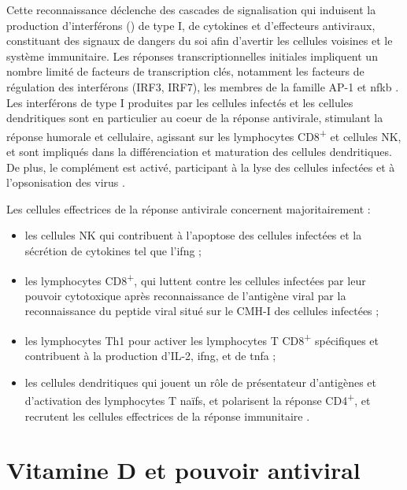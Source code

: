 \documentclass[
  a4paper,
  DIV=11,
  numbers=noendperiod,
  listof=totoc]{scrreprt}
\providecommand{\tightlist}{%
  \setlength{\itemsep}{0pt}\setlength{\parskip}{0pt}}\usepackage{longtable,booktabs,array}
\begin{document}
Cette reconnaissance déclenche des cascades de signalisation qui
induisent la production d'interférons () de type I, de
cytokines et d'effecteurs antiviraux, constituant des signaux de dangers
du soi afin d'avertir les cellules voisines et le système immunitaire.
Les réponses transcriptionnelles initiales impliquent un nombre limité
de facteurs de transcription clés, notamment les facteurs de régulation
des interférons (IRF3, IRF7), les membres de la famille AP-1 et
\ac{nfkb} \autocite{Bishop.2021,Ismailova.2022}. Les interférons de type
I produites par les cellules infectés et les cellules dendritiques sont
en particulier au coeur de la réponse antivirale, stimulant la réponse
humorale et cellulaire, agissant sur les lymphocytes
CD8\textsuperscript{+} et cellules \ac{NK}, et sont impliqués dans la
différenciation et maturation des cellules dendritiques. De plus, le
complément est activé, participant à la lyse des cellules infectées et à
l'opsonisation des virus \autocite{msd.complement.2024.official}.

Les cellules effectrices de la réponse antivirale concernent
majoritairement :

\begin{itemize}
\tightlist
\item
  les cellules \ac{NK} qui contribuent à l'apoptose des cellules
  infectées et la sécrétion de cytokines tel que l'\ac{ifng}
  \autocite{Narni-Mancinelli.2013} ;
\item
  les lymphocytes CD8\textsuperscript{+}, qui luttent contre les
  cellules infectées par leur pouvoir cytotoxique après reconnaissance
  de l'antigène viral par la reconnaissance du peptide viral situé sur
  le CMH-I des cellules infectées \autocite{Sigal.2016} ;
\item
  les lymphocytes Th1 pour activer les lymphocytes T
  CD8\textsuperscript{+} spécifiques et contribuent à la production
  d'IL-2, \ac{ifng}, et de \ac{tnfa} ;
\item
  les cellules dendritiques qui jouent un rôle de présentateur
  d'antigènes et d'activation des lymphocytes T naïfs, et polarisent la
  réponse CD4\textsuperscript{+}, et recrutent les cellules effectrices
  de la réponse immunitaire \autocite{Iwasaki.2012}.
\end{itemize}

\section{Vitamine D et pouvoir
antiviral}\label{vitamine-d-et-pouvoir-antiviral}
\end{document}

